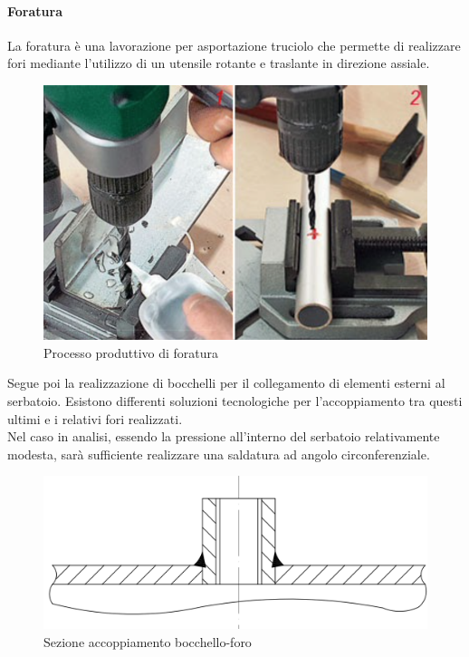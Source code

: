 \paragraph{Foratura}La foratura è una lavorazione per asportazione truciolo che permette di realizzare fori mediante l’utilizzo di un utensile rotante e traslante in direzione assiale. 
\begin{figure}[h]
    \centering
    \includegraphics[scale=0.5]{Immagini/Foratura.png}
    \caption{Processo produttivo di foratura}
    \label{fig:Foratura}
\end{figure}

Segue poi la realizzazione di bocchelli per il collegamento di elementi esterni al serbatoio. Esistono differenti soluzioni tecnologiche per l'accoppiamento tra questi ultimi e i relativi fori realizzati.\\
Nel caso in analisi, essendo la pressione all'interno del serbatoio relativamente modesta, sarà sufficiente realizzare una saldatura ad angolo circonferenziale. 
\begin{figure}[h]
    \centering
    \includegraphics[scale=0.4]{Immagini/Bocchello.png}
    \caption{Sezione accoppiamento bocchello-foro}
    \label{fig:Bocchello}
\end{figure}
